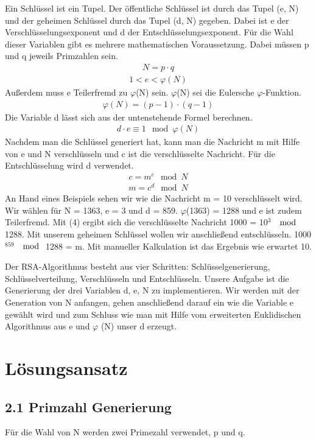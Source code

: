 \documentclass[course=asp]{aspdoc}
\begin{document}
Ein Schlüssel ist ein Tupel. Der öffentliche Schlüssel ist durch das Tupel (e, N) und der geheimen Schlüssel durch das Tupel (d, N) gegeben. Dabei ist e der Verschlüsselungsexponent und d der Entschlüsselungsexponent. Für die Wahl dieser Variablen gibt es mehrere mathematischen Voraussetzung. Dabei müssen p und q jeweils Primzahlen sein.
\begin{align}
 N = p \cdot q
\end{align}
\begin{align}
1 < e < \varphi (N)
\end{align}
Außerdem muss e Teilerfremd zu $\varphi $(N) sein. $\varphi $(N) sei die Eulersche $\varphi $-Funktion.
\begin{align}
\varphi (N) = (p - 1)\cdot(q - 1)
\end{align}
Die Variable d lässt sich aus der untenstehende Formel berechnen.
\begin{align}
d \cdot e \equiv 1 \mod \varphi (N)
\end{align}
Nachdem man die Schlüssel generiert hat, kann man die Nachricht m mit Hilfe von e und N verschlüsseln und c ist die verschlüsselte Nachricht. Für die Entschlüsselung wird d verwendet.
\begin{align}
c {=} m^e \mod N
\end{align} 
\begin{align}
m {=} c^d \mod N
\end{align} 
An Hand eines Beispiels sehen wir wie die Nachricht m = 10 verschlüsselt wird. Wir wählen für N = 1363, e = 3 und d = 859. $\varphi $(1363) = 1288 und e ist zudem Teilerfremd. Mit (4) ergibt sich die verschlüsselte Nachricht 1000 = 10$^{3}$ $\mod $ 1288. Mit unserem geheimen Schlüssel wollen wir anschließend entschlüsseln. 1000$^{859}$ $\mod $ 1288 = m. Mit manueller Kalkulation ist das Ergebnis wie erwartet 10.

Der RSA-Algorithmus besteht aus vier Schritten: Schlüsselgenerierung, Schlüsselverteilung, Verschlüsseln und Entschlüsseln. Unsere Aufgabe ist die Generierung der drei Variablen d, e, N zu implementieren. Wir werden mit der Generation von N anfangen, gehen anschließend darauf ein wie die Variable e gewählt wird und zum Schluss wie man mit Hilfe vom erweiterten Euklidischen Algorithmus aus e und $\varphi $ (N) unser d erzeugt.

\section{Lösungsansatz}  
\subsection*{2.1 Primzahl Generierung }
Für die Wahl von N werden zwei Primezahl verwendet, p und q.
\end{document}
